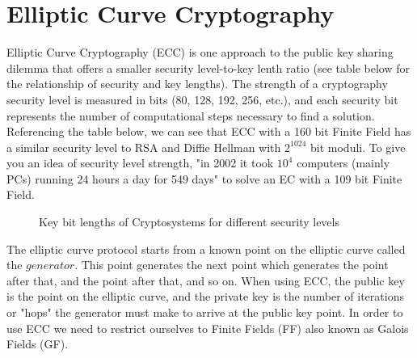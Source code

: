 \section{Elliptic Curve Cryptography}\label{sec:ECC:2}


Elliptic Curve Cryptography (ECC) is one approach to the public key sharing dilemma that offers a smaller security level-to-key lenth ratio (see table below for the relationship  of security and key lengths).  The strength of a cryptography security level is measured in bits (80, 128, 192, 256, etc.), and each security bit represents the number of computational steps necessary to find a solution.  Referencing the table below, we can see that ECC with a 160 bit Finite Field has a similar security level to RSA and Diffie Hellman with $2^{1024}$ bit moduli. To give you an idea of security level strength, "in 2002 it took $10^4$ computers (mainly PCs) running 24 hours a day for 549 days" to solve an EC with a 109 bit Finite Field. 
\begin{figure} [H]
	  \caption{\label{fig:DH:DHKE_9} Key bit lengths of Cryptosystems for different security levels }
\end{figure}
The elliptic curve protocol starts from a known point on the elliptic curve called the $generator$.  This point generates the next point which generates the point after that, and the point after that, and so on.  When using ECC, the public key is the point on the elliptic curve, and the private key is the number of iterations or "hops" the generator must make to arrive at the public key point.  In order to use ECC we need to restrict ourselves to Finite Fields (FF) also known as Galois Fields (GF).

